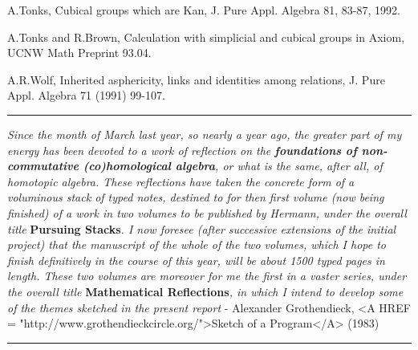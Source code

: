 A.Tonks, Cubical groups which are Kan, J. Pure Appl. Algebra
81,  83-87, 1992.  

A.Tonks and R.Brown, Calculation with simplicial and cubical
groups in Axiom, UCNW Math Preprint 93.04. 

A.R.Wolf, Inherited asphericity, links and identities among
relations, J. Pure Appl. Algebra 71 (1991) 99-107. 


\par\noindent\rule{\textwidth}{0.4pt}
\emph{Since the month of March last year, so nearly a year ago, the greater part of my energy has been devoted to a work of reflection on the \textbf{foundations of non-commutative (co)homological algebra}, or what is the same, after all, of homotopic algebra.  These reflections have taken the concrete form of a voluminous stack of typed notes, destined to for then first volume (now being finished) of a work in two volumes to be published by Hermann, under the overall title }\textbf{Pursuing Stacks}\emph{.  I now foresee (after successive extensions of the initial project) that the manuscript of the whole of the two volumes, which I hope to finish definitively in the course of this year, will be about 1500 typed pages in length.  These two volumes are moreover for me the first in a vaster series, under the overall title }\textbf{Mathematical Reflections}\emph{, in which I intend to develop some of the themes sketched in the present report} - Alexander Grothendieck, <A HREF = "http://www.grothendieckcircle.org/">Sketch of a Program</A> (1983) 
\par\noindent\rule{\textwidth}{0.4pt}

